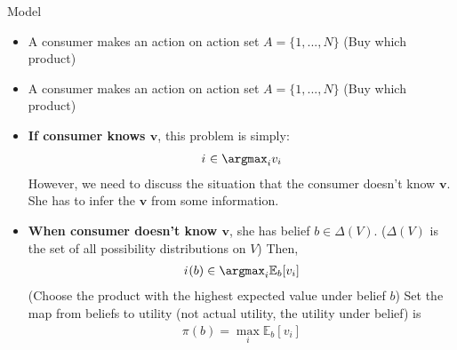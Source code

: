 \documentclass{beamer}
\begin{document}
\begin{frame}{Model}
\begin{itemize}
  \item A consumer makes an action on action set $A=\{1,...,N\}$ (Buy which product)
  \item A consumer makes an action on action set $A=\{1,...,N\}$ (Buy which product)
  \item \textbf{If consumer knows $\mathbf{v}$}, this problem is simply:
  \begin{equation}
    \begin{aligned}
      i^{\*}\in \argmax_i v_i
    \end{aligned}
    \nonumber
  \end{equation}
  However, we need to discuss the situation that the consumer doesn't know $\mathbf{v}$. She has to infer the $\mathbf{v}$ from some information.
  \item \textbf{When consumer doesn't know $\mathbf{v}$}, she has belief $b\in \Delta(V)$. ($\Delta(V)$ is the set of all possibility distributions on $V$) Then,
  \begin{equation}
    \begin{aligned}
      i^{\*}(b)\in \argmax_i  \mathbb{E}_b[v_i]
    \end{aligned}
    \nonumber
  \end{equation}
  (Choose the product with the highest expected value under belief $b$) Set the map from beliefs to utility (not actual utility, the utility under belief) is
  \begin{equation}
    \begin{aligned}
      \pi(b)=\max_i\mathbb{E}_b[v_i]
    \end{aligned}
    \nonumber
  \end{equation}
\end{itemize}

\end{frame}
\end{document}
